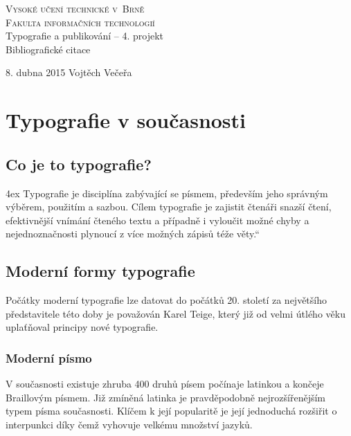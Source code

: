 \documentclass[11pt,a4paper,onecolumn]{article}
\providecommand{\myuv}[1]{\quotedblbase #1\textquotedblleft}
\begin{document}
\begin{titlepage}
  \begin{center}

    \textsc{\Huge Vysoké učení technické v~Brně\\\huge Fakulta informačních technologií}\\
    \LARGE Typografie a publikování -- 4. projekt\\\Huge
    Bibliografické citace\\
  \end{center}
  {\Large 8. dubna 2015 \hfill Vojtěch Večeřa}
\end{titlepage}

\newpage
\pagestyle{plain}
\section*{Typografie v současnosti}

\subsection*{Co je to typografie?}
\begingroup
\leftskip4ex
\rightskip\leftskip
{\myuv{Typografie je disciplína zabývající se písmem, především jeho správným výběrem, použitím a sazbou. Cílem typografie je zajistit čtenáři snazší čtení, efektivnější vnímání čteného textu a případně i vyloučit možné chyby a nejednoznačnosti plynoucí z více možných zápisů téže věty.}\citep{Strafelda:co_je_typografie}
}\par
\endgroup 


\subsection*{Moderní formy typografie}
Počátky moderní typografie lze datovat do počátků 20. století za největšího představitele této doby je považován Karel Teige, který již od velmi útlého věku uplaťňoval principy nové typografie. \citep{Pecina:o_konstruktivismu_v_typografii}

\subsubsection*{Moderní písmo}

V současnosti existuje zhruba 400 druhů písem počínaje latinkou a končeje Braillovým písmem. Již zmíněná latinka je pravděpodobně nejrozšířenějším typem písma současnosti. Klíčem k její popularitě je její jednoduchá rozšiřit o interpunkci díky čemž vyhovuje velkému množství jazyků. \citep{Jiricek:zivy_font}
\end{document}
